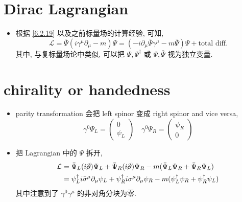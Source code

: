 \section{Dirac Lagrangian}
\begin{itemize}
	\item 根据 \eqref{6.2.19} 以及之前标量场的计算经验, 可知,
	\begin{equation} \label{7.2.1}
		\mathcal{L} = \bar{\Psi} (i \gamma^\mu \partial_\mu - m) \Psi = (- i \partial_\mu \bar{\Psi} \gamma^\mu - m \bar{\Psi}) \Psi + \text{total diff.}
	\end{equation}
	其中, 与复标量场论中类似, 可以把 $\Psi, \Psi^\dag$ 或 $\Psi, \bar{\Psi}$ 视为独立变量.
\end{itemize}

\section{chirality or handedness}
\begin{itemize}
	\item parity transformation 会把 left spinor 变成 right spinor and vice versa,
	\begin{equation}
		\gamma^0 \Psi_L = \begin{pmatrix}
			0 \\
			\psi_L
		\end{pmatrix} \quad \gamma^0 \Psi_R = \begin{pmatrix}
			\psi_R \\
			0
		\end{pmatrix}
	\end{equation}
	
	\item 把 Lagrangian 中的 $\Psi$ 拆开,
	\begin{align}
		\mathcal{L} &= \bar{\Psi}_L (i \cancel{\partial}) \Psi_L + \bar{\Psi}_R (i \cancel{\partial}) \Psi_R - m (\bar{\Psi}_L \Psi_R + \bar{\Psi}_R \Psi_L) \notag \\
		&= \psi_L^\dag i \bar{\sigma}^\mu \partial_\mu \psi_L + \psi_R^\dag i \sigma^\mu \partial_\mu \psi_R - m (\psi_L^\dag \psi_R + \psi_R^\dag \psi_L)
	\end{align}
	其中注意到了 $\gamma^0 \gamma^\mu$ 的非对角分块为零.
\end{itemize}


